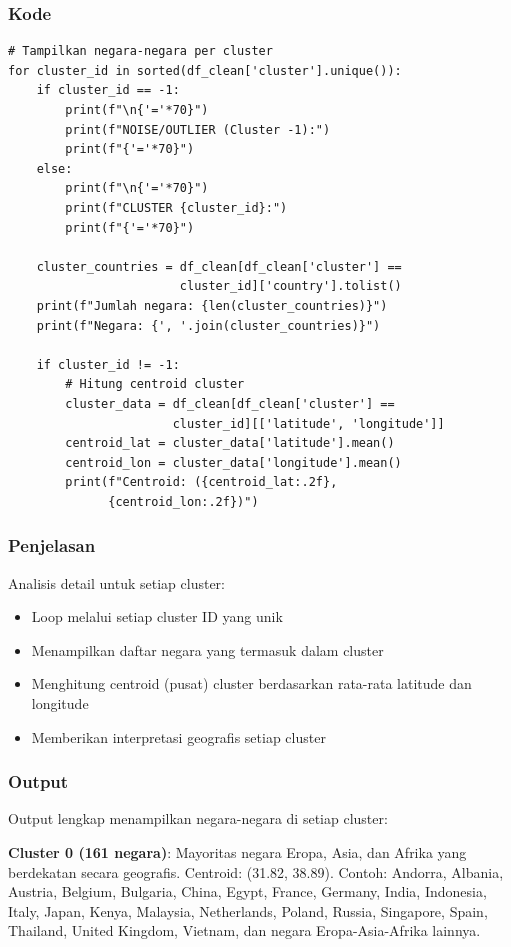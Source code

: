 \documentclass[12pt,a4paper]{article}
\begin{document}
\subsubsection{Kode}
\begin{lstlisting}[style=pythonstyle]
# Tampilkan negara-negara per cluster
for cluster_id in sorted(df_clean['cluster'].unique()):
    if cluster_id == -1:
        print(f"\n{'='*70}")
        print(f"NOISE/OUTLIER (Cluster -1):")
        print(f"{'='*70}")
    else:
        print(f"\n{'='*70}")
        print(f"CLUSTER {cluster_id}:")
        print(f"{'='*70}")
    
    cluster_countries = df_clean[df_clean['cluster'] == 
                        cluster_id]['country'].tolist()
    print(f"Jumlah negara: {len(cluster_countries)}")
    print(f"Negara: {', '.join(cluster_countries)}")
    
    if cluster_id != -1:
        # Hitung centroid cluster
        cluster_data = df_clean[df_clean['cluster'] == 
                       cluster_id][['latitude', 'longitude']]
        centroid_lat = cluster_data['latitude'].mean()
        centroid_lon = cluster_data['longitude'].mean()
        print(f"Centroid: ({centroid_lat:.2f}, 
              {centroid_lon:.2f})")
\end{lstlisting}

\subsubsection{Penjelasan}
Analisis detail untuk setiap cluster:
\begin{itemize}
    \item Loop melalui setiap cluster ID yang unik
    \item Menampilkan daftar negara yang termasuk dalam cluster
    \item Menghitung centroid (pusat) cluster berdasarkan rata-rata latitude dan longitude
    \item Memberikan interpretasi geografis setiap cluster
\end{itemize}

\subsubsection{Output}
Output lengkap menampilkan negara-negara di setiap cluster:

\textbf{Cluster 0 (161 negara)}: Mayoritas negara Eropa, Asia, dan Afrika yang berdekatan secara geografis. Centroid: (31.82, 38.89). Contoh: Andorra, Albania, Austria, Belgium, Bulgaria, China, Egypt, France, Germany, India, Indonesia, Italy, Japan, Kenya, Malaysia, Netherlands, Poland, Russia, Singapore, Spain, Thailand, United Kingdom, Vietnam, dan negara Eropa-Asia-Afrika lainnya.
\end{document}
